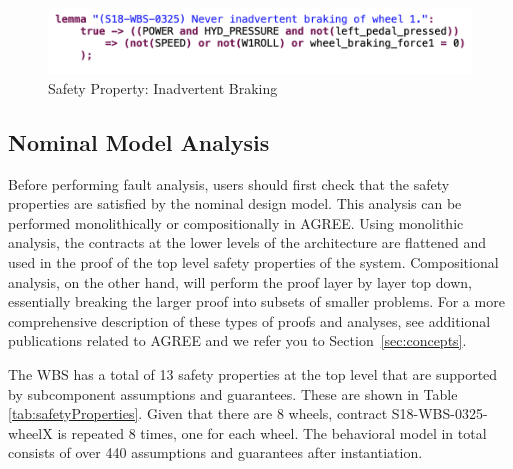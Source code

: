 \begin{figure}[htbp]
	\begin{center}
		\includegraphics[width=.9\textwidth]{images/inadvBraking.png}
	\end{center}
	\vspace{-0.3in}
	\caption{Safety Property: Inadvertent Braking}
	\label{fig:inadvertent_braking}
\end{figure}

\subsection{Nominal Model Analysis}
Before performing fault analysis, users should first check that the safety properties are satisfied by the nominal design model. This analysis can be performed monolithically or compositionally in AGREE. Using monolithic analysis, the contracts at the lower levels of the architecture are flattened and used in the proof of the top level safety properties of the system. Compositional analysis, on the other hand, will perform the proof layer by layer top down, essentially breaking the larger proof into subsets of smaller problems. For a more comprehensive description of these types of proofs and analyses, see additional publications related to AGREE \cite{cofer2012compositional,QFCS15:backes} and we refer you to Section~\ref{sec:concepts}.

The WBS has a total of 13 safety properties at the top level that are supported by subcomponent assumptions and guarantees. These are shown in Table \ref{tab:safetyProperties}. Given that there are 8 wheels, contract S18-WBS-0325-wheelX is repeated 8 times, one for each wheel. The behavioral model in total consists of over 440 assumptions and guarantees after instantiation.


